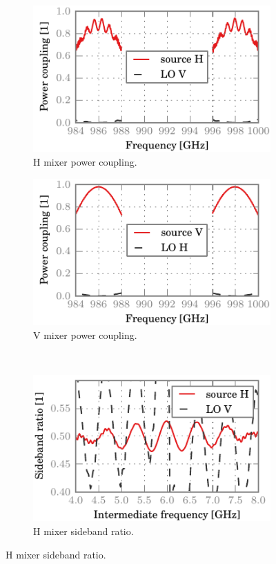 \begin{figure}[hbtp]
    \centering
    \begin{subfigure}[b]{.5\textwidth}
        \includegraphics{chapter_3/13_lor_att10_h_dsb}%
        \caption{H mixer power coupling.}
    \end{subfigure}%
    \begin{subfigure}[b]{.5\textwidth}
        \includegraphics{chapter_3/13_lor_att10_v_dsb}%
        \caption{V mixer power coupling.}
    \end{subfigure}%
    \\
    \begin{subfigure}[b]{.5\textwidth}
        \includegraphics{chapter_3/13_lor_att10_h_sbr}%
        \caption{H mixer sideband ratio.}
    \end{subfigure}%

\end{figure}
